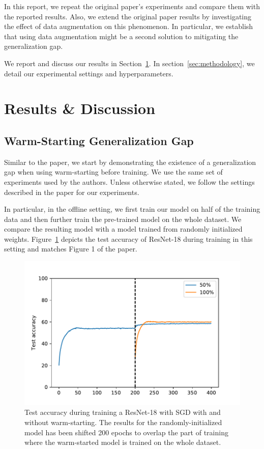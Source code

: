 In this report, we repeat the original paper's experiments and compare them with the reported results. Also, we extend the original paper results by investigating the effect of data augmentation on this phenomenon. In particular, we establish that using data augmentation might be a second solution to mitigating the generalization gap.

We report and discuss our results in Section~\ref{sec:results-and-discussion}. In section~\ref{sec:methodology}, we detail our experimental settings and hyperparameters. 


\section{Results \& Discussion}
\label{sec:results-and-discussion}

\subsection{Warm-Starting Generalization Gap}
Similar to the paper, we start by demonstrating the existence of a generalization gap when using warm-starting before training. We use the same set of experiments used by the authors. Unless otherwise stated, we follow the settings described in the paper for our experiments. 

In particular, in the offline setting, we first train our model on half of the training data and then further train the pre-trained model on the whole dataset. We compare the resulting model with a model trained from randomly initialized weights. Figure~\ref{fig:offline-warmup-vs-random-CIFAR-10} depicts the test accuracy of ResNet-18 \cite{he_deep_2016} during training in this setting and matches Figure 1 of the paper. 


\begin{figure}
    \includegraphics[width=\linewidth]{figures/fig1_test_accuracy.pdf}
    \caption{Test accuracy during training a ResNet-18 with SGD with and without warm-starting. The results for the randomly-initialized model has been shifted 200 epochs to overlap the part of training where the warm-started model is trained on the whole dataset. }
    \label{fig:offline-warmup-vs-random-CIFAR-10}
\end{figure}

